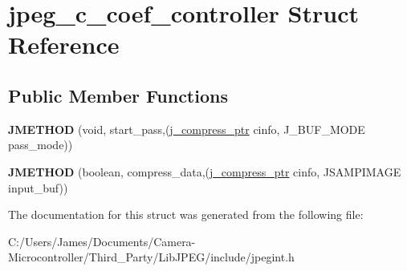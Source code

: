 \hypertarget{structjpeg__c__coef__controller}{}\section{jpeg\+\_\+c\+\_\+coef\+\_\+controller Struct Reference}
\label{structjpeg__c__coef__controller}
\subsection*{Public Member Functions}
\begin{DoxyCompactItemize}
\item 
\mbox{\label{structjpeg__c__coef__controller_ad56be8c40b98dd5bb131e6b98cbd75f4}} 
{\bfseries J\+M\+E\+T\+H\+OD} (void, start\+\_\+pass,(\hyperlink{structjpeg__compress__struct}{j\+\_\+compress\+\_\+ptr} cinfo, J\+\_\+\+B\+U\+F\+\_\+\+M\+O\+DE pass\+\_\+mode))
\item 
\mbox{\label{structjpeg__c__coef__controller_a8038db222f516f432fdd397af62c7282}} 
{\bfseries J\+M\+E\+T\+H\+OD} (boolean, compress\+\_\+data,(\hyperlink{structjpeg__compress__struct}{j\+\_\+compress\+\_\+ptr} cinfo, J\+S\+A\+M\+P\+I\+M\+A\+GE input\+\_\+buf))
\end{DoxyCompactItemize}


The documentation for this struct was generated from the following file\+:\begin{DoxyCompactItemize}
\item 
C\+:/\+Users/\+James/\+Documents/\+Camera-\/\+Microcontroller/\+Third\+\_\+\+Party/\+Lib\+J\+P\+E\+G/include/jpegint.\+h\end{DoxyCompactItemize}
